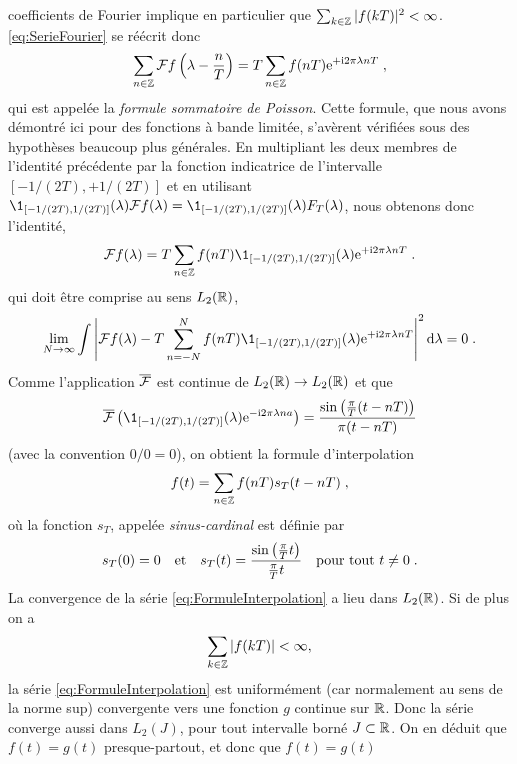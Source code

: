 coefficients de Fourier implique en particulier que $\sum_{k \in \mathbb{Z}} |f(kT)|^2 < \infty$. \eqref{eq:SerieFourier} se r{\'e}{\'e}crit donc
\begin{equation}
\label{eq:FormuleSommatoirePoisson}
\sum_{n \in \mathbb{Z}} \mathcal{F} f \left( \lambda - \frac{n}{T} \right)  = T \sum_{n \in \mathbb{Z}} f(nT) \mathrm{e}^{+ \mathrm{i} 2 \pi \lambda n T}\;,
\end{equation}
qui est appel{\'e}e la \emph{formule sommatoire de Poisson}. Cette formule, que nous avons d{\'e}montr{\'e} ici pour des fonctions {\`a} bande limit{\'e}e, s'av{\`e}rent v{\'e}rifi{\'e}es
sous des hypoth{\`e}ses beaucoup plus g{\'e}n{\'e}rales. En multipliant les deux membres de l'identit{\'e} pr{\'e}c{\'e}dente par la fonction indicatrice de l'intervalle
$[-1/(2T),+1/(2T)]$ et en utilisant $\1_{[-1/(2T),1/(2T)]}(\lambda) \TF f (\lambda)= \1_{[-1/(2T),1/(2T)]}(\lambda) F_T(\lambda)$,
nous obtenons donc l'identit{\'e},
$$
\TF f (\lambda) = T \sum_{n \in \zset} f(nT) \1_{[-1/(2T),1/(2T)]}(\lambda) \rme^{+ \rmi 2 \pi \lambda n T} \eqsp.
$$
qui doit {\^e}tre comprise au sens $L_2(\mathbb{R})$,
$$
\lim_{N \to \infty} \int \left| \TF f(\lambda)  - T \sum_{n =-N}^N f(nT) \1_{[-1/(2T),1/(2T)]}(\lambda) \rme^{+ \rmi 2 \pi
    \lambda n T}  \right|^2 \rmd \lambda = 0 \eqsp.
$$
Comme l'application $\overline{\mathcal{F}}$ est continue de $L_2(\mathbb{R}) \to L_2(\mathbb{R})$ et que
$$
\TFAC{\1_{[-1/(2T),1/(2T)]}(\lambda) \rme^{- \rmi 2 \pi \lambda n a}}= \frac{\sin\left( \frac{\pi}{T}(t - nT)\right)}{\pi(t-nT)}
$$
(avec la convention $0/0=0$), on obtient la formule d'interpolation
\begin{equation}
\label{eq:FormuleInterpolation}
f(t) = \sum_{n \in \mathbb{Z}} f(nT) s_T(t-nT)  \;,
\end{equation}
o{\`u} la fonction $s_T$, appel{\'e}e \emph{sinus-cardinal} est d{\'e}finie par
\begin{equation}
\label{eq:SinusCardinal}
s_T(0)=0\quad\text{et}\quad s_T(t) = \frac{\sin \left( \frac{\pi}{T} t\right) }{ \frac{\pi}{T} t}\quad\text{pour tout $t\neq0$} \;.
\end{equation}
La convergence de la s{\'e}rie \eqref{eq:FormuleInterpolation} a lieu dans $L_2(\mathbb{R})$. Si de plus on a
$$
\sum_{k \in \mathbb{Z}} |f(kT)| < \infty,
$$
la s{\'e}rie \eqref{eq:FormuleInterpolation} est uniform{\'e}ment (car normalement au sens de la norme sup) convergente vers une
fonction $g$ continue sur $\mathbb{R}$. Donc la
s{\'e}rie converge aussi dans $L_2(J)$, pour tout intervalle born{\'e} $J \subset \mathbb{R}$. On en d{\'e}duit que $f(t)= g(t)$ presque-partout, et donc que $f(t)= g(t)$
